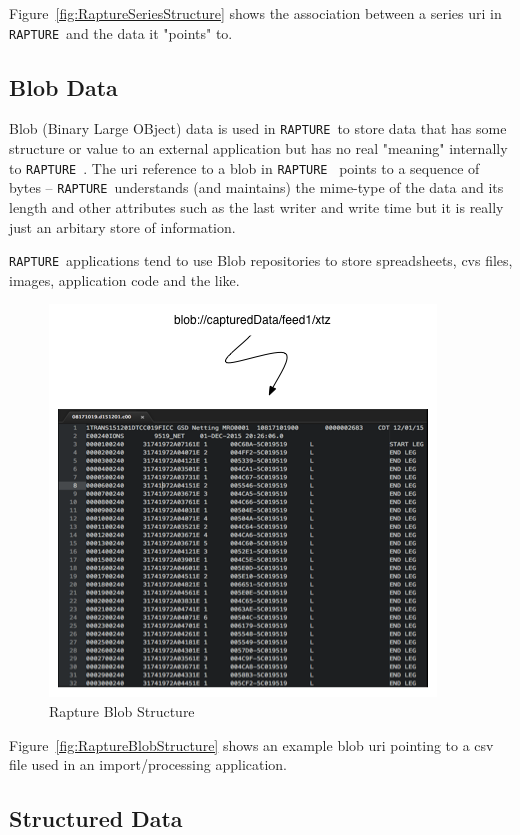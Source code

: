 \documentclass[12pt,twoside,a4paper]{book}
\newcommand{\Rapture}{\Verb+RAPTURE+~}
\begin{document}
Figure~\vref{fig:RaptureSeriesStructure} shows the association between a series uri in \Rapture and the data
it "points" to.

\subsection{Blob Data}

Blob (Binary Large OBject) data is used in \Rapture to store data that has some structure or value to an
external application but has no real "meaning" internally to \Rapture. The uri reference to a blob in \Rapture
points to a sequence of bytes -- \Rapture understands (and maintains) the mime-type of the data and its length
and other attributes such as the last writer and write time but it is really just an arbitary store of information.

\Rapture applications tend to use Blob repositories to store spreadsheets, cvs files, images, application code and the like.

\begin{figure}[htb]
\centering
\includegraphics[scale=0.75]{Graphics/RaptureBlobExplain}
\caption{Rapture Blob Structure}
\label{fig:RaptureBlobStructure}
\end{figure}

Figure~\vref{fig:RaptureBlobStructure} shows an example blob uri pointing to a csv file
used in an import/processing application.

\subsection{Structured Data}
\end{document}
